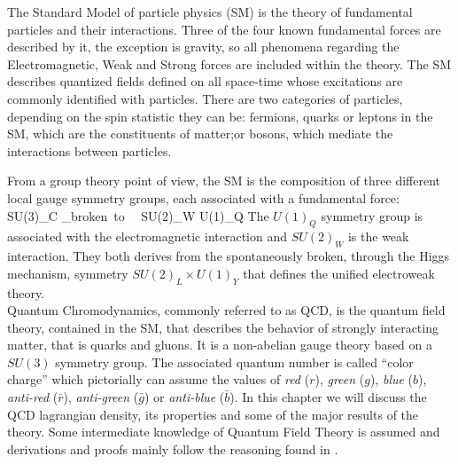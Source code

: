 The Standard Model of particle physics (SM) is the theory of fundamental particles and their interactions. Three of the four known fundamental forces are described by it, the exception is gravity, so all phenomena regarding the Electromagnetic, Weak and Strong forces are included within the theory. The SM describes quantized fields defined on all space-time whose excitations are commonly identified with particles. There are two categories of particles, depending on the spin statistic they can be: fermions, quarks or leptons in the SM, which are the constituents of matter;or bosons, which mediate the interactions between particles.\\
\begin{center}
  
\end{center}
From a group theory point of view, the SM is the composition of three different local gauge symmetry groups, each associated with a fundamental force:
\beq
    SU(3)_C \times {}_{broken~to~~ SU(2)_W \times U(1)_{Q}}
\eeq
The $U(1)_{Q}$ symmetry group is associated with the electromagnetic interaction and $SU(2)_{W}$ is the weak interaction. They both derives from the spontaneously broken, through the Higgs mechanism, symmetry $SU(2)_L \times U(1)_{Y}$ that defines the unified electroweak theory. \\ 
Quantum Chromodynamics, commonly referred to as QCD, is the quantum field theory, contained in the SM, that describes the behavior of strongly interacting matter, that is quarks and gluons. It is a non-abelian gauge theory based on a $SU(3)$ symmetry group. The associated quantum number is called ``color charge'' which pictorially can assume the values of \textit{red} ($r$), \textit{green} ($g$), \textit{blue} ($b$), \textit{anti-red} ($\bar r$), \textit{anti-green} ($\bar g$) or \textit{anti-blue} ($\bar b$). In this chapter we will discuss the QCD lagrangian density, its properties and some of the major results of the theory. Some intermediate knowledge of Quantum Field Theory is assumed and derivations and proofs mainly follow the reasoning found in \cite{peskin}. 


